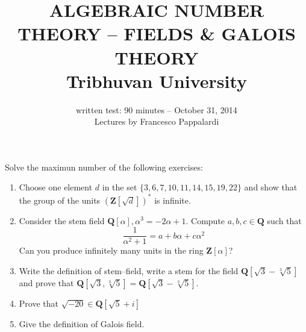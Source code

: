 \documentclass[a4paper,12pt]{article}
\title{ALGEBRAIC NUMBER THEORY -- FIELDS \& GALOIS THEORY\\
Tribhuvan University}
\author{written test: 90 minutes -- October 31, 2014\\ Lectures by Francesco Pappalardi}
\begin{document}
\maketitle
\thispagestyle{empty}

Solve the maximun number of the following exercises:

\begin{enumerate}
 \item Choose one element $d$ in the set $\{3,6,7,10,11,14,15,19,22\}$ and show that the group 
 of the units $(\textbf{Z}[\sqrt{d}])^*$ is infinite.\bigskip
 \item Consider the stem field $\textbf{Q}[\alpha], \alpha^3=-2\alpha+1$. Compute $a, b, c\in\textbf{Q}$ such that
 $$\frac{1}{\alpha^2+1}=a+b\alpha+c\alpha^2$$\bigskip
 Can you produce infinitely many units in the ring $\textbf{Z}[\alpha]$?
 \item Write the definition of stem--field, write a stem for the field $\textbf{Q}[\sqrt{3}-\sqrt[3]{5}]$ 
 and prove that $\textbf{Q}[\sqrt{3},\sqrt[3]{5}]=\textbf{Q}[\sqrt{3}-\sqrt[3]{5}]$.\bigskip
 \item Prove that $\sqrt{-20}\in\textbf{Q}[\sqrt{5}+i]$\bigskip
 \item Give the definition of Galois field.
\end{enumerate}
\end{document}
